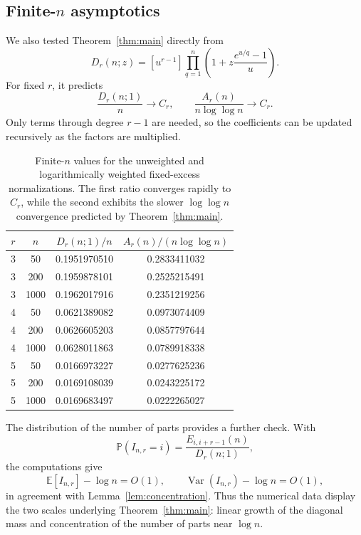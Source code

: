 \documentclass[11pt]{article}
\theoremstyle{definition}
\begin{document}
\subsection{Finite-$n$ asymptotics}

We also tested Theorem~\ref{thm:main} directly from
\[
 D_r(n;z)
 =
 [u^{r-1}]
 \prod_{q=1}^{n}
 \left(
 1+z\frac{e^{u/q}-1}{u}
 \right).
\]
For fixed $r$, it predicts
\[
        \frac{D_r(n;1)}{n}\longrightarrow C_r,
        \qquad
        \frac{A_r(n)}{n\log\log n}\longrightarrow C_r.
\]
Only terms through degree $r-1$ are needed, so the coefficients can
be updated recursively as the factors are multiplied.

\begin{table}[ht]
\centering
\begin{tabular}{c c c c}
\hline
$r$ & $n$ &
$\displaystyle D_r(n;1)/n$ &
$\displaystyle A_r(n)/(n\log\log n)$\\
\hline
3 & 50   & 0.1951970510 & 0.2833411032\\
3 & 200  & 0.1959878101 & 0.2525215491\\
3 & 1000 & 0.1962017916 & 0.2351219256\\
4 & 50   & 0.0621389082 & 0.0973074409\\
4 & 200  & 0.0626605203 & 0.0857797644\\
4 & 1000 & 0.0628011863 & 0.0789918338\\
5 & 50   & 0.0166973227 & 0.0277625236\\
5 & 200  & 0.0169108039 & 0.0243225172\\
5 & 1000 & 0.0169683497 & 0.0222265027\\
\hline
\end{tabular}
\caption{Finite-$n$ values for the unweighted and logarithmically
weighted fixed-excess normalizations.  The first ratio converges
rapidly to $C_r$, while the second exhibits the slower
$\log\log n$ convergence predicted by Theorem~\ref{thm:main}.}
\label{tab:finite-n}
\end{table}

The distribution of the number of parts provides a further check.
With
\[
 \mathbb P(I_{n,r}=i)
 =
 \frac{E_{i,i+r-1}(n)}{D_r(n;1)},
\]
the computations give
\[
 \mathbb E[I_{n,r}]-\log n=O(1),
 \qquad
 \operatorname{Var}(I_{n,r})-\log n=O(1),
\]
in agreement with Lemma~\ref{lem:concentration}.  Thus the numerical
data display the two scales underlying Theorem~\ref{thm:main}: linear
growth of the diagonal mass and concentration of the number of parts
near $\log n$.
\end{document}
